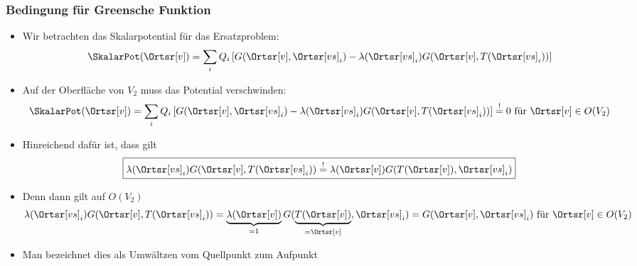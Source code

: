     \begin{frame}
      \frametitle{Bedingung für Greensche Funktion}
    \begin{itemize}[<+->]
\item Wir betrachten das Skalarpotential für das Ersatzproblem:
      \begin{equation*}
        \SkalarPot(\Ortsr[v]) =  \sum_i Q_i \left[G(\Ortsr[v],\Ortsr[vs]_i) -\lambda(\Ortsr[vs]_i) G(\Ortsr[v],T(\Ortsr[vs]_i))\right]
      \end{equation*}
      \item Auf der Oberfläche von $V_2$ muss das Potential verschwinden:
      \begin{equation*}
        \SkalarPot(\Ortsr[v]) =  \sum_i Q_i \left[G(\Ortsr[v],\Ortsr[vs]_i) -\lambda(\Ortsr[vs]_i) G(\Ortsr[v],T(\Ortsr[vs]_i))\right] \stackrel{!}{=} 0 \text{ für } \Ortsr[v] \in O(V_2)
      \end{equation*}
    \item \alert{Hinreichend} dafür ist, dass gilt
      \begin{equation*}
        \boxed{\lambda(\Ortsr[vs]_i) G(\Ortsr[v],T(\Ortsr[vs]_i)) \stackrel{!}{=}  \lambda(\Ortsr[v]) G(T(\Ortsr[v]), \Ortsr[vs]_i)} 
      \end{equation*}
    \item Denn dann gilt auf $O(V_2)$
      \begin{equation*}
        \lambda(\Ortsr[vs]_i) G(\Ortsr[v],T(\Ortsr[vs]_i)) =  \underbrace{\lambda(\Ortsr[v])}_{=1} G(\underbrace{T(\Ortsr[v])}_{=\Ortsr[v]},\Ortsr[vs]_i) =  G(\Ortsr[v],\Ortsr[vs]_i) \text{ für } \Ortsr[v] \in O(V_2)
      \end{equation*}
  \item Man bezeichnet dies als \alert{Umwältzen vom Quellpunkt zum Aufpunkt}    
 \end{itemize}   
      
\end{frame}


